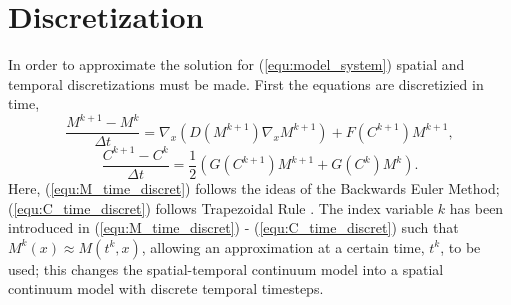 \section{Discretization}

In order to approximate the solution for (\ref{equ:model_system}) spatial and temporal discretizations must be made.
First the equations are discretizied in time, 
\begin{equation} \label{equ:M_time_discret}
  \frac{M^{k+1} - M^{k}}{\Delta t} = \nabla_x (D(M^{k+1}) \nabla_x M^{k+1}) + F(C^{k+1}) M^{k+1},
\end{equation}
\begin{equation} \label{equ:C_time_discret}
  \frac{C^{k+1} - C^{k}}{\Delta t} = \frac{1}{2} ( G(C^{k+1}) M^{k+1} + G(C^{k}) M^{k} ).
\end{equation}
Here, (\ref{equ:M_time_discret}) follows the ideas of the Backwards Euler Method; (\ref{equ:C_time_discret}) follows Trapezoidal Rule \citep{burden2010numerical}. 
The index variable $k$ has been introduced in (\ref{equ:M_time_discret}) - (\ref{equ:C_time_discret}) such that $M^{k}(x) \approx M(t^{k}, x)$, allowing an approximation at a certain time, $t^{k}$, to be used; this changes the spatial-temporal continuum model into a spatial continuum model with discrete temporal timesteps. 


